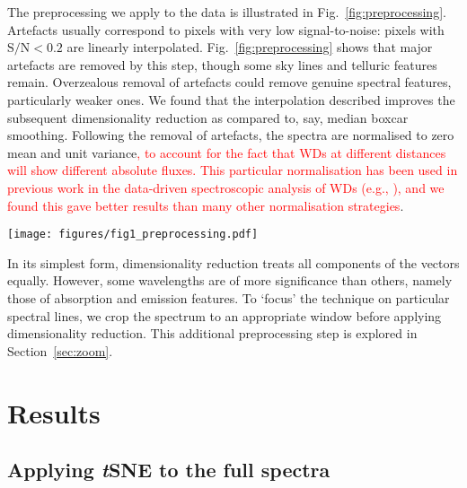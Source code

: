\documentclass[fleqn,usenatbib]{mnras}
\newcommand{\red}[1]{\textcolor{red}{#1}}
\begin{document}
The preprocessing we apply to the data is illustrated in Fig.~\ref{fig:preprocessing}.
Artefacts usually correspond to pixels with very low signal-to-noise: pixels with $\mathrm{S}/\mathrm{N}<0.2$ are linearly interpolated.
Fig.~\ref{fig:preprocessing} shows that major artefacts are removed by this step, though some sky lines and telluric features remain.
Overzealous removal of artefacts could remove genuine spectral features, particularly weaker ones.
We found that the interpolation described improves the subsequent dimensionality reduction as compared to, say, median boxcar smoothing.
Following the removal of artefacts, the spectra are normalised to zero mean and unit variance\red{, to account for the fact that WDs at different distances will show different absolute fluxes.
This particular normalisation has been used in previous work in the data-driven spectroscopic analysis of WDs (e.g., \citealt{vincent23}), and we found this gave better results than many other normalisation strategies}.

\begin{figure*}
\centering
\texttt{[image: figures/fig1\_preprocessing.pdf]}
\caption{
    Preprocessing stages, as illustrated on the cherry-picked DESI EDR spectrum of WD J170114.72+760207.16.
    The upper panel shows the raw spectrum, with several artefacts.
    The second panel shows that the signal-to-noise ratio is very low near many of these artefacts; where it falls below 0.2, the pixels are interpolated.
    The spectra are then rescaled to zero mean and unit variance, as shown in the lower panel.
    Major artefacts have been removed, though certain imperfect sky subtraction and telluric features remain, particularly above $7500\,\text{\AA}$.
}
\label{fig:preprocessing}
\end{figure*}

In its simplest form, dimensionality reduction treats all components of the vectors equally.
However, some wavelengths are of more significance than others, namely those of absorption and emission features.
To `focus' the technique on particular spectral lines, we crop the spectrum to an appropriate window before applying dimensionality reduction.
This additional preprocessing step is explored in Section~\ref{sec:zoom}.

\section{Results}
\label{sec:results}

\subsection{Applying \textit{t}SNE to the full spectra}
\label{sec:full_spectra}
\end{document}
